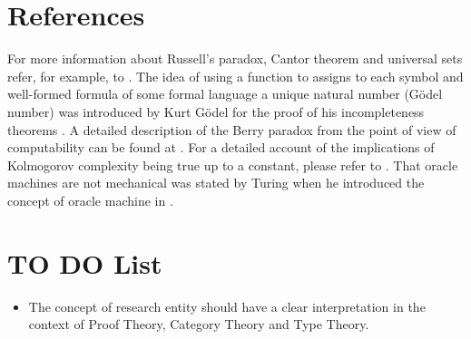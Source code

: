 %
%

\section*{References}

For more information about Russell's paradox, Cantor theorem and universal sets refer, for example, to \cite{jech2013set}. The idea of using a function to assigns to each symbol and well-formed formula of some formal language a unique natural number (Gödel number) was introduced by Kurt Gödel for the proof of his incompleteness theorems \cite{godel1931formal}. A detailed description of the Berry paradox from the point of view of computability can be found at \cite{chaitin1995berry}. For a detailed account of the implications of Kolmogorov complexity being true up to a constant, please refer to \cite{li2013introduction}. That oracle machines are not mechanical was stated by Turing when he introduced the concept of oracle machine in \cite{turing1939systems}.

%
%

\section*{TO DO List}

\begin{itemize}

\item The concept of research entity should have a clear interpretation in the context of Proof Theory, Category Theory and Type Theory.

\end{itemize}


